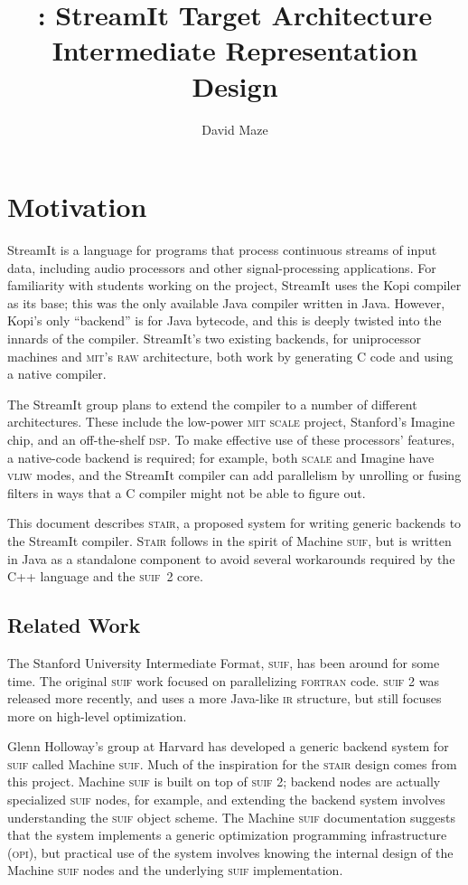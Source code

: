 \documentclass[11pt]{article}
\title{\Stair: StreamIt Target Architecture Intermediate
  Representation\\Design}
\author{David Maze\\\dmazemail}
\def\dsp{\textsc{dsp}}
\def\fortran{\textsc{fortran}}
\def\ir{\textsc{ir}}
\def\mit{\textsc{mit}}
\def\opi{\textsc{opi}}
\def\raw{\textsc{raw}}
\def\scale{\textsc{scale}}
\def\stair{\textsc{stair}}
\def\Stair{\textsc{Stair}}
\def\suif{\textsc{suif}}
\def\vliw{\textsc{vliw}}
\def\machsuif{Machine \suif}
\begin{document}
\maketitle
\tableofcontents

\section{Motivation}

StreamIt is a language for programs that process continuous streams of
input data, including audio processors and other signal-processing
applications.  For familiarity with students working on the project,
StreamIt uses the Kopi compiler\cite{kopi} as its base; this was the
only available Java compiler written in Java.  However, Kopi's only
``backend'' is for Java bytecode, and this is deeply twisted into the
innards of the compiler.  StreamIt's two existing backends, for
uniprocessor machines and \mit's \raw{} architecture, both work by
generating C code and using a native compiler.

The StreamIt group plans to extend the compiler to a number of
different architectures.  These include the low-power \mit{} \scale{}
project, Stanford's Imagine chip, and an off-the-shelf \dsp.  To make
effective use of these processors' features, a native-code backend is
required; for example, both \scale{} and Imagine have \vliw{} modes,
and the StreamIt compiler can add parallelism by unrolling or fusing
filters in ways that a C compiler might not be able to figure out.

This document describes \stair, a proposed system for writing generic
backends to the StreamIt compiler.  \Stair{} follows in the spirit of
\machsuif\cite{machsuif}, but is written in Java as a standalone
component to avoid several workarounds required by the C++ language
and the \suif~2 core.

\subsection{Related Work}

The Stanford University Intermediate Format, \suif\cite{suif,suif2},
has been around for some time.  The original \suif{} work focused on
parallelizing \fortran{} code.  \suif{} 2 was released more recently,
and uses a more Java-like \ir{} structure, but still focuses more on
high-level optimization.

Glenn Holloway's group at Harvard has developed a generic backend
system for \suif{} called \machsuif\cite{machsuif}.  Much of the
inspiration for the \stair{} design comes from this project.
\machsuif{} is built on top of \suif{} 2; backend nodes are actually
specialized \suif{} nodes, for example, and extending the backend
system involves understanding the \suif{} object scheme.  The
\machsuif{} documentation suggests that the system implements a
generic optimization programming infrastructure (\opi), but practical
use of the system involves knowing the internal design of the
\machsuif{} nodes and the underlying \suif{} implementation.
\end{document}
